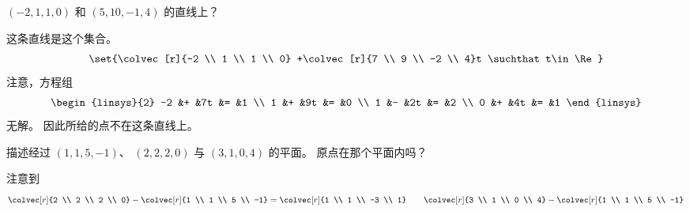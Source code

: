 \begin{exercises}
    \( (-2,1,1,0) \) 和 \( (5,10,-1,4) \) 的直线上？
    \begin{answer}
      这条直线是这个集合。
      \begin{equation*}
        \set{\colvec[r]{-2 \\ 1 \\ 1 \\ 0}
             +\colvec[r]{7 \\ 9 \\ -2 \\ 4}t \suchthat t\in\Re }
      \end{equation*}
      注意，方程组
      \begin{equation*}
        \begin{linsys}{2}
          -2  &+  &7t  &=  &1  \\
           1  &+  &9t  &=  &0  \\
           1  &-  &2t  &=  &2  \\
           0  &+  &4t  &=  &1  
        \end{linsys}
      \end{equation*}
      无解。
      因此所给的点不在这条直线上。  
    \end{answer}
  \recommended \item
     \begin{exparts}
        \partsitem 描述经过 \( (1,1,5,-1) \)、
           \( (2,2,2,0) \) 与 \( (3,1,0,4) \) 的平面。
        \partsitem 原点在那个平面内吗？
      \end{exparts}
    \begin{answer}
      \begin{exparts}
        \partsitem 注意到
          \begin{equation*}
            \colvec[r]{2 \\ 2 \\ 2 \\ 0}
            -\colvec[r]{1 \\ 1 \\ 5 \\ -1}
            =\colvec[r]{1 \\ 1 \\ -3 \\ 1}
            \qquad
            \colvec[r]{3 \\ 1 \\ 0 \\ 4}
            -\colvec[r]{1 \\ 1 \\ 5 \\ -1}

\end{equation*}
\end{exparts}
\end{answer}
\end{exercises}
